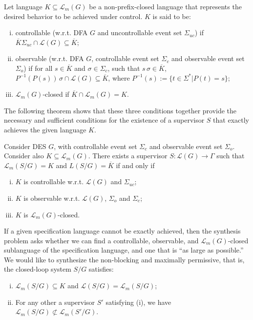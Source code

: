\documentclass[journal,twoside,web]{ieeecolor}
\begin{document}
Let language $K \subseteq \mathcal{L}_m(G)$ be a non-prefix-closed language that represents the desired behavior to be achieved under control. $K$ is said to be:
\begin{enumerate}[(i)]
    \item controllable (w.r.t. DFA $G$ and uncontrollable event set $\Sigma_{uc}$) if $\overline{K} \Sigma_{uc} \cap \mathcal{L}(G) \subseteq \overline{K}$;
    \item observable (w.r.t. DFA $G$, controllable event set $\Sigma_c$ and observable event set $\Sigma_o$) if for all $s \in \overline{K}$ and $\sigma \in \Sigma_c$,
    such that $s \, \sigma \in \overline{K}$, $P^{-1}(P(s)) \, \sigma \cap \mathcal{L}(G) \subseteq \overline{K}$, where $P^{-1}(s) := \{ t \in \Sigma^* | P(t) = s \}$;
    \item $\mathcal{L}_m(G)$-closed if $\overline{K} \cap \mathcal{L}_m(G) = K$. 
\end{enumerate}
%
The following theorem shows that these three conditions together provide the necessary and sufficient conditions for the existence of a supervisor $S$ that exactly achieves the given language $K$.
%
\begin{theorem}
    Consider DES $G$, with controllable event set $\Sigma_c$ and observable event set $\Sigma_o$. Consider also $K \subseteq \mathcal{L}_m(G)$. 
    There exists a supervisor $S : \mathcal{L}(G) \rightarrow \Gamma$ such that $\mathcal{L}_m(S /G) = K$ and $L(S / G) = \overline{K}$ if and only if
\begin{enumerate}[(i)]
    \item $K$ is controllable w.r.t. $\mathcal{L}(G)$ and $\Sigma_{uc}$;
    \item $K$ is observable w.r.t. $\mathcal{L}(G)$, $\Sigma_o$ and $\Sigma_c$;
    \item $K$ is $\mathcal{L}_m(G)$-closed.
\end{enumerate}
\end{theorem}

If a given specification language cannot be exactly achieved,
then the synthesis problem asks whether we can find a controllable, observable, and $\mathcal{L}_m(G)$-closed sublanguage of the specification language, and one that is ``as large as possible.''
We would like to synthesize the non-blocking and maximally permissive, that is, the closed-loop system $S / G$ satisfies:
\begin{enumerate}[(i)]
    \item $\mathcal{L}_m(S /G) \subseteq K$ and $\mathcal{L}(S /G) = \mathcal{L}_m(S /G)$;
    \item For any other a supervisor $S'$ satisfying (i), we have $\mathcal{L}_m(S / G) \not \subset \mathcal{L}_m(S' / G)$.
\end{enumerate}
%
\end{document}
